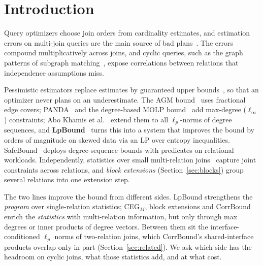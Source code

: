 \documentclass[sigconf, nonacm, acmthm=false]{acmart}
\begin{document}
\maketitle

\vldbtopmatter


\section{Introduction}
\label{sec:intro}

Query optimizers choose join orders from cardinality estimates, and
estimation errors on multi-join queries are the main source of bad
plans~\cite{leis2015goodare,han2021stats}. The errors compound
multiplicatively across joins, and cyclic queries, such as the graph
patterns of subgraph matching~\cite{park2020gcare}, expose correlations
between relations that independence assumptions miss.

Pessimistic estimators replace estimates by guaranteed upper
bounds~\cite{cai2019pessimistic,abokhamis2025pessimistic}, so that an
optimizer never plans on an underestimate.
The AGM bound~\cite{atserias2008agm} uses fractional edge covers;
PANDA~\cite{abokhamis2017panda} and the degree-based MOLP
bound~\cite{joglekar2016molp} add max-degree ($\ell_\infty$)
constraints; Abo Khamis et al.~\cite{abokhamis2024lpnorm} extend them to
all $\ell_p$-norms of degree sequences, and
\textbf{LpBound}~\cite{zhang2025lpbound} turns this into a system that
improves the bound by orders of magnitude on skewed data via an LP over
entropy inequalities. SafeBound~\cite{deeds2023safebound} deploys
degree-sequence bounds with predicates on relational workloads.
Independently, statistics over small multi-relation joins~\cite{chen2022ceg,salihoglu2026ceg} capture joint constraints across relations, and \emph{block extensions} (Section~\ref{sec:blocks}) group several relations into one extension step.

The two lines improve the bound from different sides. LpBound strengthens
the \emph{program} over single-relation statistics; CEG$_M$, block
extensions and CorrBound~\cite{mayer2026corrbound} enrich the
\emph{statistics} with multi-relation information, but only through max
degrees or inner products of degree vectors. Between them sit the
interface-conditioned $\ell_p$ norms of two-relation joins, which
CorrBound's shared-interface products overlap only in part
(Section~\ref{sec:related}). We ask which side has the headroom on
cyclic joins, what those statistics add, and at what cost.
\end{document}
